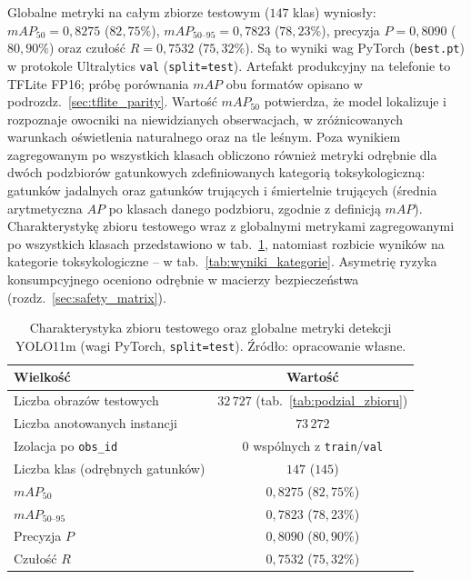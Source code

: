 Globalne metryki na całym zbiorze testowym ($147$ klas) wyniosły: $mAP_{50}=0{,}8275$ ($82{,}75\%$), $mAP_{50\text{--}95}=0{,}7823$ ($78{,}23\%$), precyzja $P=0{,}8090$ ($80{,}90\%$) oraz czułość $R=0{,}7532$ ($75{,}32\%$). Są to wyniki wag PyTorch (\texttt{best.pt}) w protokole Ultralytics \texttt{val} (\texttt{split=test}). Artefakt produkcyjny na telefonie to TFLite FP16; próbę porównania $mAP$ obu formatów opisano w podrozdz.~\ref{sec:tflite_parity}. Wartość $mAP_{50}$ potwierdza, że model lokalizuje i rozpoznaje owocniki na niewidzianych obserwacjach, w zróżnicowanych warunkach oświetlenia naturalnego oraz na tle leśnym. Poza wynikiem zagregowanym po wszystkich klasach obliczono również metryki odrębnie dla dwóch podzbiorów gatunkowych zdefiniowanych kategorią toksykologiczną: gatunków jadalnych oraz gatunków trujących i śmiertelnie trujących (średnia arytmetyczna $AP$ po klasach danego podzbioru, zgodnie z definicją $mAP$). Charakterystykę zbioru testowego wraz z globalnymi metrykami zagregowanymi po wszystkich klasach przedstawiono w tab.~\ref{tab:wyniki_detekcji}, natomiast rozbicie wyników na kategorie toksykologiczne – w tab.~\ref{tab:wyniki_kategorie}. Asymetrię ryzyka konsumpcyjnego oceniono odrębnie w macierzy bezpieczeństwa (rozdz.~\ref{sec:safety_matrix}).

\begin{table}[h!]
 \centering
 \caption{Charakterystyka zbioru testowego oraz globalne metryki detekcji YOLO11m (wagi PyTorch, \texttt{split=test}). Źródło: opracowanie własne.}
 \label{tab:wyniki_detekcji}
 \begin{tabular}{|l|c|}
 \hline
 \textbf{Wielkość} & \textbf{Wartość} \\
 \hline \hline
 Liczba obrazów testowych & $32\,727$ \quad (tab.~\ref{tab:podzial_zbioru}) \\
 \hline
 Liczba anotowanych instancji & $73\,272$ \\
 \hline
 Izolacja po \texttt{obs\_id} & $0$ wspólnych z \texttt{train}/\texttt{val} \\
 \hline
 Liczba klas (odrębnych gatunków) & $147$ ($145$) \\
 \hline \hline
 $mAP_{50}$ & $0{,}8275$ \quad ($82{,}75\%$) \\
 \hline
 $mAP_{50\text{--}95}$ & $0{,}7823$ \quad ($78{,}23\%$) \\
 \hline
 Precyzja $P$ & $0{,}8090$ \quad ($80{,}90\%$) \\
 \hline
 Czułość $R$ & $0{,}7532$ \quad ($75{,}32\%$) \\
 \hline
 \end{tabular}
\end{table}

